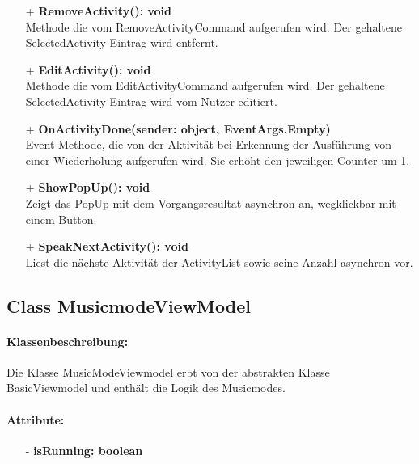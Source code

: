 \documentclass[a4paper,12pt]{article}
\begin{document}
\begin{itemize}
	\item[+] \textbf{RemoveActivity(): void} \\  Methode die vom RemoveActivityCommand aufgerufen wird. Der gehaltene SelectedActivity Eintrag wird entfernt. 
	\item[+] \textbf{EditActivity(): void} \\ Methode die vom EditActivityCommand aufgerufen wird. Der gehaltene SelectedActivity Eintrag wird vom Nutzer editiert.
	\item[+] \textbf{ OnActivityDone(sender: object, EventArgs.Empty)} \\ Event Methode, die von der Aktivität bei Erkennung der Ausführung von einer Wiederholung aufgerufen wird. Sie erhöht den jeweiligen Counter um 1.  
	\item[+] \textbf{ShowPopUp(): void} \\ Zeigt das PopUp mit dem Vorgangsresultat asynchron an, wegklickbar mit einem Button. 
	\item[+] \textbf{SpeakNextActivity(): void} \\ Liest die nächste Aktivität der ActivityList sowie seine Anzahl asynchron vor. 
\end{itemize}

\subsection{Class MusicmodeViewModel}
\paragraph{Klassenbeschreibung:}
Die Klasse MusicModeViewmodel erbt von der abstrakten Klasse BasicViewmodel und enthält die Logik des Musicmodes.
\paragraph{Attribute:}
\begin{itemize}
	\item[-] \textbf{isRunning: boolean}
\end{itemize}
\end{document}
